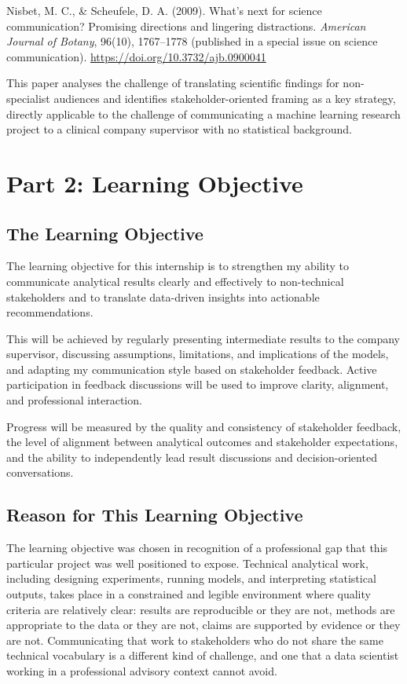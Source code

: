 \documentclass[11pt,a4paper]{report}
\begin{document}
Nisbet, M. C., \& Scheufele, D. A. (2009). What's next for science communication? Promising
directions and lingering distractions. \textit{American Journal of Botany}, 96(10), 1767--1778 (published in a special issue on science communication).
\url{https://doi.org/10.3732/ajb.0900041}

This paper analyses the challenge of translating scientific findings for non-specialist audiences
and identifies stakeholder-oriented framing as a key strategy, directly applicable to the challenge
of communicating a machine learning research project to a clinical company supervisor with no
statistical background.

\chapter{Part 2: Learning Objective}

\section{The Learning Objective}

The learning objective for this internship is to strengthen my ability to communicate analytical
results clearly and effectively to non-technical stakeholders and to translate data-driven insights
into actionable recommendations.

This will be achieved by regularly presenting intermediate results to the company supervisor,
discussing assumptions, limitations, and implications of the models, and adapting my communication
style based on stakeholder feedback. Active participation in feedback discussions will be used to
improve clarity, alignment, and professional interaction.

Progress will be measured by the quality and consistency of stakeholder feedback, the level of
alignment between analytical outcomes and stakeholder expectations, and the ability to independently
lead result discussions and decision-oriented conversations.

\section{Reason for This Learning Objective}

The learning objective was chosen in recognition of a professional gap that this particular project
was well positioned to expose. Technical analytical work, including designing experiments, running models,
and interpreting statistical outputs, takes place in a constrained and legible environment where
quality criteria are relatively clear: results are reproducible or they are not, methods are
appropriate to the data or they are not, claims are supported by evidence or they are not.
Communicating that work to stakeholders who do not share the same technical vocabulary is a
different kind of challenge, and one that a data scientist working in a professional advisory
context cannot avoid.
\end{document}
